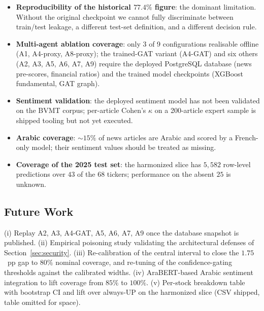 \documentclass[conference]{IEEEtran}
\begin{document}
\begin{itemize}
\item \textbf{Reproducibility of the historical $77.4\%$ figure}: the dominant limitation. Without the original checkpoint we cannot fully discriminate between train/test leakage, a different test-set definition, and a different decision rule.
\item \textbf{Multi-agent ablation coverage}: only 3 of 9 configurations realisable offline (A1, A4-proxy, A8-proxy); the trained-GAT variant (A4-GAT) and six others (A2, A3, A5, A6, A7, A9) require the deployed PostgreSQL database (news pre-scores, financial ratios) and the trained model checkpoints (XGBoost fundamental, GAT graph).
\item \textbf{Sentiment validation}: the deployed sentiment model has not been validated on the BVMT corpus; per-article Cohen's $\kappa$ on a 200-article expert sample is shipped tooling but not yet executed.
\item \textbf{Arabic coverage}: $\sim\!15\%$ of news articles are Arabic and scored by a French-only model; their sentiment values should be treated as missing.
\item \textbf{Coverage of the 2025 test set}: the harmonized slice has $5{,}582$ row-level predictions over $43$ of the $68$ tickers; performance on the absent $25$ is unknown.
\end{itemize}

\subsection{Future Work}

(i) Replay A2, A3, A4-GAT, A5, A6, A7, A9 once the database snapshot is published. (ii) Empirical poisoning study validating the architectural defenses of Section~\ref{sec:security}. (iii) Re-calibration of the central interval to close the $1.75$~pp gap to $80\%$ nominal coverage, and re-tuning of the confidence-gating thresholds against the calibrated widths. (iv) AraBERT-based Arabic sentiment integration to lift coverage from $85\%$ to $100\%$. (v) Per-stock breakdown table with bootstrap CI and lift over always-UP on the harmonized slice (CSV shipped, table omitted for space).
\end{document}
